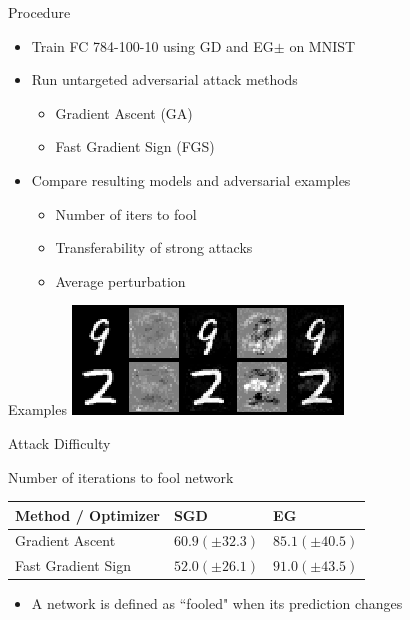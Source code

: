 \documentclass{beamer}
\begin{document}
	\begin{frame}{Procedure}
		\begin{itemize}
			\item Train FC 784-100-10 using GD and EG$\pm$ on MNIST
			\item Run untargeted adversarial attack methods
			\begin{itemize}
				\item Gradient Ascent (GA)
				\item Fast Gradient Sign (FGS)
			\end{itemize}
			\item Compare resulting models and adversarial examples
			\begin{itemize}
				\item Number of iters to fool
				\item Transferability of strong attacks
				\item Average perturbation
			\end{itemize}
		\end{itemize}
	\end{frame}
	
	\begin{frame}{Examples}
		\centering
		\includegraphics[width=\textwidth]{mnist_attacks}
	\end{frame}
	
	\begin{frame}{Attack Difficulty}
		\begin{block}{Number of iterations to fool network}
			\begin{center}
				\begin{tabular}{ l | l | l }
					Method / Optimizer & SGD & EG \\ \hline
					Gradient Ascent & $60.9 (\pm 32.3)$ & $85.1 (\pm 40.5)$ \\ \hline
					Fast Gradient Sign & $52.0 (\pm 26.1)$ & $91.0 (\pm 43.5)$
				\end{tabular}
			\end{center}
		\end{block}
		\begin{itemize}
			\item A network is defined as ``fooled" when its prediction changes
		\end{itemize}
	\end{frame}
	
\end{document}
